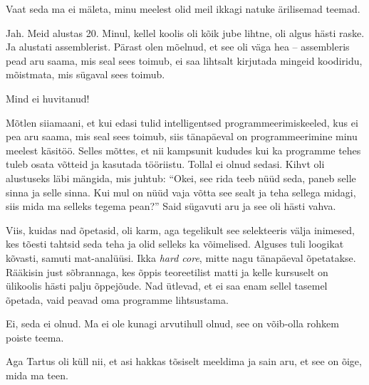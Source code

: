Vaat seda ma ei mäleta, minu meelest olid meil ikkagi natuke 
ärilisemad teemad.


Jah. Meid alustas 20. Minul, kellel 
koolis oli kõik jube lihtne, oli algus hästi raske. Ja alustati 
assemblerist. Pärast olen mõelnud, et see oli väga hea -- 
assembleris pead aru saama, mis seal 
sees toimub, ei saa lihtsalt kirjutada mingeid koodiridu, mõistmata, mis sügaval sees toimub. 


Mind ei huvitanud!


Mõtlen siiamaani, et kui edasi tulid intelligentsed 
programmeerimiskeeled, kus ei pea aru saama, mis seal sees toimub, siis 
tänapäeval on programmeerimine minu meelest 
käsitöö. Selles mõttes, et nii kampsunit kududes kui ka 
programme tehes tuleb osata võtteid ja kasutada tööriistu. Tollal
ei olnud sedasi. Kihvt oli alustuseks läbi mängida, mis juhtub: 
\enquote{Okei, see rida teeb nüüd seda, paneb selle sinna ja selle sinna. Kui 
mul on nüüd vaja võtta see sealt ja teha sellega midagi, siis mida ma selleks tegema 
pean?} Said sügavuti aru ja see oli hästi vahva. 

Viis, kuidas nad õpetasid, oli karm, aga tegelikult see 
selekteeris välja inimesed, kes tõesti tahtsid seda teha ja olid selleks ka
võimelised. Alguses tuli loogikat kõvasti, samuti mat-analüüsi. Ikka 
\emph{hard core}, mitte nagu tänapäeval õpetatakse. Rääkisin just
sõbrannaga, kes õppis teoreetilist matti ja kelle kursuselt on ülikoolis 
hästi palju õppejõude. Nad ütlevad, et ei saa enam sellel tasemel õpetada, vaid peavad oma 
programme lihtsustama. 


Ei, seda ei olnud. Ma ei ole kunagi arvutihull olnud, see on 
võib-olla rohkem poiste teema. 


Aga Tartus oli küll nii, et asi hakkas tõsiselt meeldima ja sain aru, et see 
on õige, mida ma teen. 

